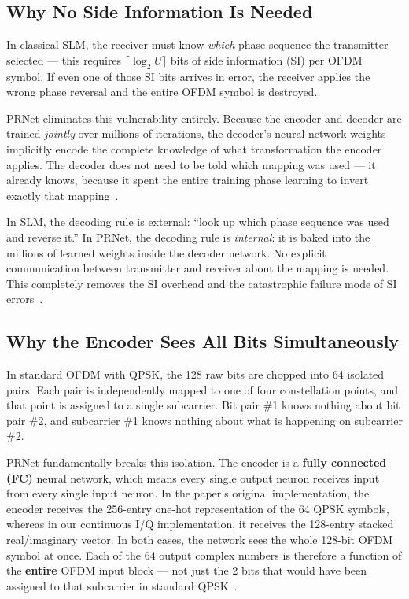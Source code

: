 \subsection{Why No Side Information Is Needed}

In classical SLM, the receiver must know \emph{which} phase sequence the transmitter selected --- this requires $\lceil\log_2 U\rceil$ bits of side information (SI) per OFDM symbol. If even one of those SI bits arrives in error, the receiver applies the wrong phase reversal and the entire OFDM symbol is destroyed.

PRNet eliminates this vulnerability entirely.  Because the encoder and decoder are trained \emph{jointly} over millions of iterations, the decoder's neural network weights implicitly encode the complete knowledge of what transformation the encoder applies.  The decoder does not need to be told which mapping was used --- it already knows, because it spent the entire training phase learning to invert exactly that mapping~\cite{kim2017novel}.

\begin{keyinsight}
    In SLM, the decoding rule is external: ``look up which phase sequence was used and reverse it.''  In PRNet, the decoding rule is \emph{internal}: it is baked into the millions of learned weights inside the decoder network. No explicit communication between transmitter and receiver about the mapping is needed.  This completely removes the SI overhead and the catastrophic failure mode of SI errors~\cite{kim2017novel}.
\end{keyinsight}


\subsection{Why the Encoder Sees All Bits Simultaneously}

In standard OFDM with QPSK, the 128 raw bits are chopped into 64 isolated pairs.  Each pair is independently mapped to one of four constellation points, and that point is assigned to a single subcarrier.  Bit pair \#1 knows nothing about bit pair \#2, and subcarrier \#1 knows nothing about what is happening on subcarrier \#2.

PRNet fundamentally breaks this isolation.  The encoder is a \textbf{fully connected (FC)} neural network, which means every single output neuron receives input from every single input neuron.  In the paper's original implementation, the encoder receives the 256-entry one-hot representation of the 64 QPSK symbols, whereas in our continuous I/Q implementation, it receives the 128-entry stacked real/imaginary vector. In both cases, the network sees the whole 128-bit OFDM symbol at once.  Each of the 64 output complex numbers is therefore a function of the \textbf{entire} OFDM input block --- not just the 2 bits that would have been assigned to that subcarrier in standard QPSK~\cite{kim2017novel}.

